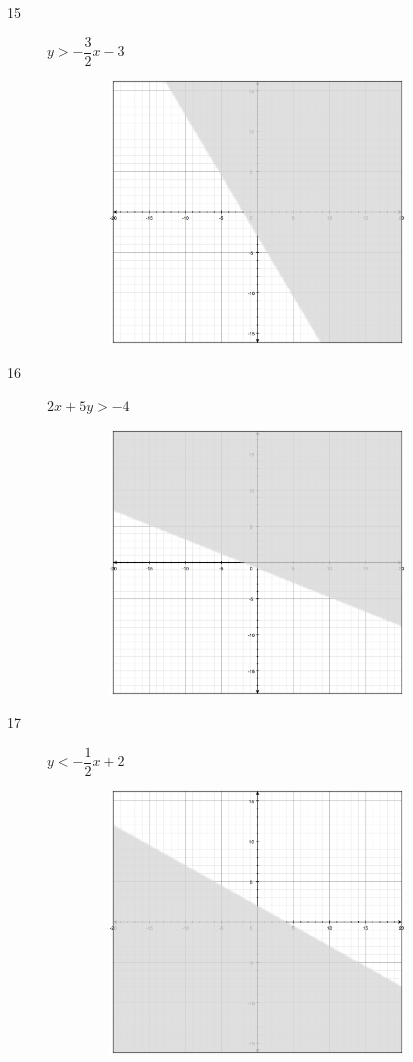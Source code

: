 \documentclass[fleqn,addpoints]{exam}
\begin{document}
\begin{description}

\item[15]
$y > - \dfrac{3}{2} x - 3$
\begin{figure}[H]
  \includegraphics[width=9cm,height=7cm]{p364/15}
\end{figure}

\pagebreak

\item[16]
$2x+5y > -4$
\begin{figure}[H]
  \includegraphics[width=9cm,height=7cm]{p364/16.eps}
\end{figure}

\item[17]
$y < - \dfrac{1}{2} x + 2$
\begin{figure}[H]
  \includegraphics[width=9cm,height=7cm]{p364/17}
\end{figure}


\end{description}
\end{document}
